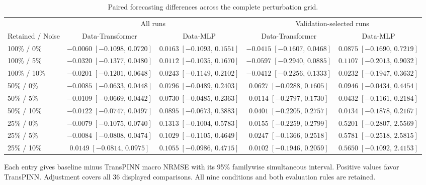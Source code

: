 \begin{table}[t]
\centering
\caption{Paired forecasting differences across the complete perturbation grid.}
\label{tab:robustness_full_grid}
\footnotesize
\setlength{\tabcolsep}{4pt}
\renewcommand{\arraystretch}{1.08}
\begin{tabular*}{\textwidth}{@{\extracolsep{\fill}}lcccc@{}}
\toprule
& \multicolumn{2}{c}{All runs} & \multicolumn{2}{c}{Validation-selected runs} \\
Retained / Noise & Data-Transformer & Data-MLP & Data-Transformer & Data-MLP \\
\midrule
100\% / 0\% & $-0.0060\;[-0.1098,\,0.0720]$ & $0.0163\;[-0.1093,\,0.1551]$ & $-0.0415\;[-0.1607,\,0.0468]$ & $0.0875\;[-0.1690,\,0.7219]$ \\
100\% / 5\% & $-0.0320\;[-0.1377,\,0.0480]$ & $0.0112\;[-0.1035,\,0.1670]$ & $-0.0597\;[-0.2940,\,0.0885]$ & $0.1107\;[-0.2013,\,0.9032]$ \\
100\% / 10\% & $-0.0201\;[-0.1201,\,0.0648]$ & $0.0243\;[-0.1149,\,0.2102]$ & $-0.0412\;[-0.2256,\,0.1333]$ & $0.0232\;[-0.1947,\,0.3632]$ \\
50\% / 0\% & $-0.0085\;[-0.0633,\,0.0448]$ & $0.0796\;[-0.0489,\,0.2403]$ & $0.0627\;[-0.0288,\,0.1605]$ & $0.0946\;[-0.0434,\,0.4454]$ \\
50\% / 5\% & $-0.0109\;[-0.0669,\,0.0442]$ & $0.0730\;[-0.0485,\,0.2363]$ & $0.0114\;[-0.2797,\,0.1730]$ & $0.0432\;[-0.1161,\,0.2184]$ \\
50\% / 10\% & $-0.0122\;[-0.0747,\,0.0497]$ & $0.0895\;[-0.0673,\,0.3883]$ & $0.0401\;[-0.2205,\,0.2757]$ & $0.0134\;[-0.1878,\,0.2167]$ \\
25\% / 0\% & $-0.0079\;[-0.1075,\,0.0740]$ & $0.1313\;[-0.1004,\,0.5783]$ & $0.0155\;[-0.2259,\,0.2799]$ & $0.5201\;[-0.2807,\,2.5569]$ \\
25\% / 5\% & $-0.0084\;[-0.0808,\,0.0474]$ & $0.1029\;[-0.1105,\,0.4649]$ & $0.0247\;[-0.1366,\,0.2518]$ & $0.5781\;[-0.2518,\,2.5815]$ \\
25\% / 10\% & $0.0149\;[-0.0814,\,0.0975]$ & $0.1055\;[-0.0986,\,0.4715]$ & $0.0102\;[-0.1946,\,0.2059]$ & $0.5650\;[-0.1092,\,2.4153]$ \\
\bottomrule
\end{tabular*}
\par\smallskip
\begin{minipage}{\textwidth}\footnotesize Each entry gives baseline minus TransPINN macro NRMSE with its 95\% familywise simultaneous interval. Positive values favor TransPINN. Adjustment covers all 36 displayed comparisons. All nine conditions and both evaluation rules are retained.\end{minipage}
\end{table}

